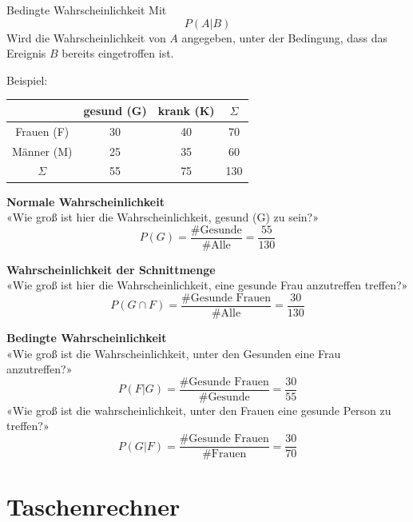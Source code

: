 \begin{multicols}{2}
\begin{definition*}{Bedingte Wahrscheinlichkeit}{}
Mit
$$P(A|B)$$
Wird die Wahrscheinlichkeit von $A$ angegeben, unter der Bedingung,
dass das Ereignis $B$ bereits eingetroffen ist.
\end{definition*}

Beispiel:

\begin{tabular}{c|c|c|c}
           & gesund (G)& krank (K)& $\Sigma$ \\\hline
Frauen (F) &        30 &       40 &       70 \\\hline
Männer (M) &        25 &       35 &       60 \\\hline
$\Sigma$   &        55 &       75 &      130 \\\hline
 \end{tabular}

\textbf{Normale Wahrscheinlichkeit}\\
«Wie groß ist hier die Wahrscheinlichkeit, gesund (G) zu sein?»
$$P(G) = \frac{\textrm{\#Gesunde}}{\textrm{\#Alle}} =  \frac{55}{130}$$

\textbf{Wahrscheinlichkeit der Schnittmenge}\\
«Wie groß ist hier die Wahrscheinlichkeit, eine gesunde Frau anzutreffen treffen?»
$$P(G\cap F) = \frac{\textrm{\#Gesunde Frauen}}{\textrm{\#Alle}}= \frac{30}{130}$$

\textbf{Bedingte Wahrscheinlichkeit}\\
«Wie groß ist die Wahrscheinlichkeit, unter den Gesunden eine Frau anzutreffen?»
$$P(F | G) = \frac{\textrm{\#Gesunde Frauen}}{\textrm{\#Gesunde}} =  \frac{30}{55}$$
«Wie groß ist die wahrscheinlichkeit, unter den Frauen eine gesunde Person zu treffen?»
$$P(G | F) = \frac{\textrm{\#Gesunde Frauen}}{\textrm{\#Frauen}}=  \frac{30}{70}$$


\end{multicols}


\newpage


\section*{Taschenrechner}

